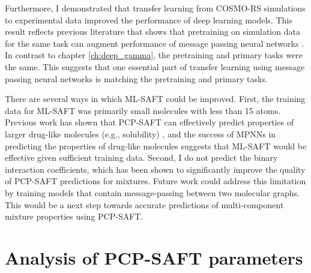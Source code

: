 Furthermore, I demonstrated that transfer learning from COSMO-RS simulations to experimental data improved the performance of deep learning models. This result reflects previous literature that shows that pretraining on simulation data for the same task can augment performance of message passing neural networks \cite{Vermeire2021}. In contrast to chapter \ref{ch:deep_gamma}, the pretraining and primary tasks were the  same. This suggests that one essential part of transfer learning using message passing neural networks is matching the pretraining and primary tasks.

There are several ways in which ML-SAFT could be improved. First, the training data for ML-SAFT was primarily small molecules with less than 15 atoms. Previous work has shown that PCP-SAFT can effectively predict properties of larger drug-like molecules (e.g., solubility) \cite{Klajmon2020}, and the success of MPNNs in predicting the properties of drug-like molecules suggests that ML-SAFT would be effective given sufficient training data. Second, I do not predict the binary interaction coefficients, which has been shown to significantly improve the quality of PCP-SAFT predictions for mixtures. Future work could address this limitation by training models that contain message-passing between two molecular graphs. This would be a next step towards accurate predictions of multi-component mixture properties using PCP-SAFT.

\section{Analysis of PCP-SAFT parameters}\label{app:sensitivity}





